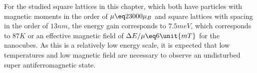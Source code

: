 \documentclass[\main/dresen_thesis.tex]{subfiles}
\begin{document}
  For the studied square lattices in this chapter, which both have particles with magnetic moments in the order of $\mu \eq 23000 \mu_B$ and square lattices with spacing in the order of $13 \unit{nm}$, the energy gain corresponds to $7.5 \unit{meV}$, which corresponds to $87 \unit{K}$ or an effective magnetic field of $\Delta E / \mu \eq 6 \unit{mT}$ for the nanocubes.
  As this is a relatively low energy scale, it is expected that low temperatures and low magnetic field are necessary to observe an undisturbed super antiferromagnetic state.
\end{document}
